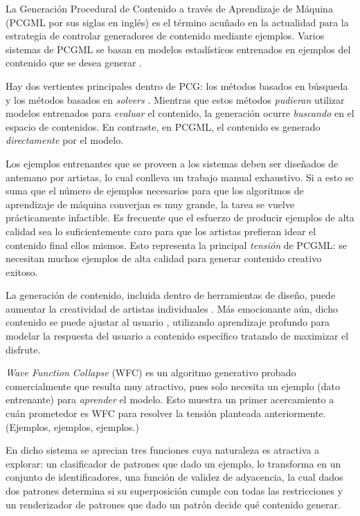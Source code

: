 La Generación Procedural de Contenido a través de Aprendizaje de Máquina (PCGML por sus siglas en inglés)
es el término acuñado en la actualidad para la estrategia de controlar
generadores de contenido mediante ejemplos. Varios sistemas
de PCGML se basan en modelos estadísticos entrenados en ejemplos
del contenido que se desea generar \cite{bib:1}. 

Hay dos vertientes principales dentro de PCG: 
los métodos basados en búsqueda \cite{bib:8} y los métodos
basados en \textit{solvers} \cite{bib:9} \cite{bib:10}.
Mientras que estos métodos \textit{pudieran} utilizar modelos
entrenados para \textit{evaluar} el contenido, la generación
ocurre \textit{buscando} en el espacio de contenidos.
En contraste, en PCGML, el contenido es generado 
\textit{directamente} por el modelo.

Los ejemplos entrenantes que se proveen
a los sistemas deben ser diseñados de antemano por artistas, lo cual
conlleva un trabajo manual exhaustivo. Si a esto se suma que el número
de ejemplos necesarios para que los algoritmos de aprendizaje de máquina
converjan es muy grande, la tarea se vuelve prácticamente infactible.
Es frecuente que el esfuerzo de producir ejemplos de alta calidad
sea lo suficientemente caro para que los artistas prefieran idear
el contenido final ellos mismos. Esto representa la principal
\textit{tensión} de PCGML: se necesitan muchos ejemplos de alta calidad
para generar contenido creativo exitoso.

La generación de contenido, incluida dentro de herramientas de diseño,
puede aumentar la creatividad de artistas individuales \cite{bib:4}.
Más emocionante aún, dicho contenido se puede ajustar al usuario
\cite{bib:7}, utilizando aprendizaje profundo para modelar la respuesta
del usuario a contenido específico tratando de maximizar
el disfrute.

\textit{Wave Function Collapse} (WFC) \cite{bib:2} es un algoritmo generativo probado
comercialmente que resulta muy atractivo, pues
solo necesita un ejemplo (dato entrenante) para \textit{aprender} el modelo.
Esto muestra un primer acercamiento a cuán
prometedor es WFC para resolver la tensión planteada anteriormente.
(Ejemplos, ejemplos, ejemplos.)

En dicho sistema se aprecian tres funciones
cuya naturaleza es atractiva a explorar: un clasificador de patrones 
que dado un ejemplo, lo transforma en un conjunto de identificadores,
una función de validez de adyacencia, la cual dados dos patrones determina
si su superposición cumple con todas las restricciones y un 
renderizador de patrones que dado un patrón decide qué contenido generar.

